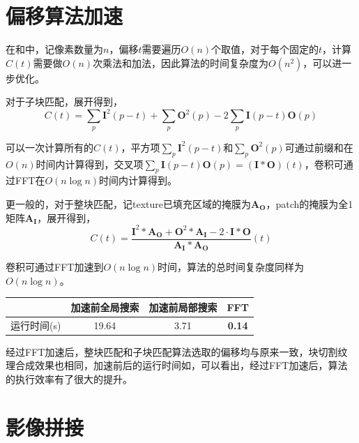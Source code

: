 \documentclass[11pt,a4paper]{article}
\begin{document}
\section{偏移算法加速}

在和中，记像素数量为$n$，偏移$t$需要遍历$O(n)$个取值，对于每个固定的$t$，计算$C(t)$需要做$O(n)$次乘法和加法，因此算法的时间复杂度为$O(n^2)$，可以进一步优化。

对于子块匹配，展开得到，
\begin{equation}
    C(t) = \sum_p\mathbf{I}^2(p-t) + \sum_p\mathbf{O}^2(p) - 2\sum_p\mathbf{I}(p-t)\mathbf{O}(p)
\end{equation}

可以一次计算所有的$C(t)$，平方项$\sum_p\mathbf{I}^2(p-t)$和$\sum_p\mathbf{O}^2(p)$可通过前缀和在$O(n)$时间内计算得到，交叉项$\sum_p\mathbf{I}(p-t)\mathbf{O}(p)=(\mathbf{I}*\mathbf{O})(t)$，卷积可通过FFT在$O(n\log n)$时间内计算得到。

更一般的，对于整块匹配，记texture已填充区域的掩膜为$\mathbf{A}_{\mathbf{O}}$，patch的掩膜为全1矩阵$\mathbf{A}_\mathbf{I}$，展开得到，
\begin{equation}
    C(t) = \frac{\mathbf{I}^2 * \mathbf{A}_\mathbf{O} + \mathbf{O}^2 * \mathbf{A}_\mathbf{I} - 2\cdot\mathbf{I}*\mathbf{O}}{\mathbf{A}_\mathbf{I} * \mathbf{A}_\mathbf{O}}(t)
\end{equation}

卷积可通过FFT加速到$O(n \log n)$时间，算法的总时间复杂度同样为$O(n \log n)$。

\begin{table}[H]
    \centering
    \caption{整块匹配加速前后的运行时间}
    \label{tab:entire_speed}
    \begin{longtable}{l|ccc}
        \toprule
         & 加速前全局搜索 & 加速前局部搜索 & FFT\tabularnewline
        \midrule
        运行时间(s) & 19.64 & 3.71 & \textbf{0.14}\tabularnewline
        \bottomrule
    \end{longtable}
\end{table}

经过FFT加速后，整块匹配和子块匹配算法选取的偏移均与原来一致，块切割纹理合成效果也相同，加速前后的运行时间如，可以看出，经过FFT加速后，算法的执行效率有了很大的提升。

\section{影像拼接}
\end{document}
